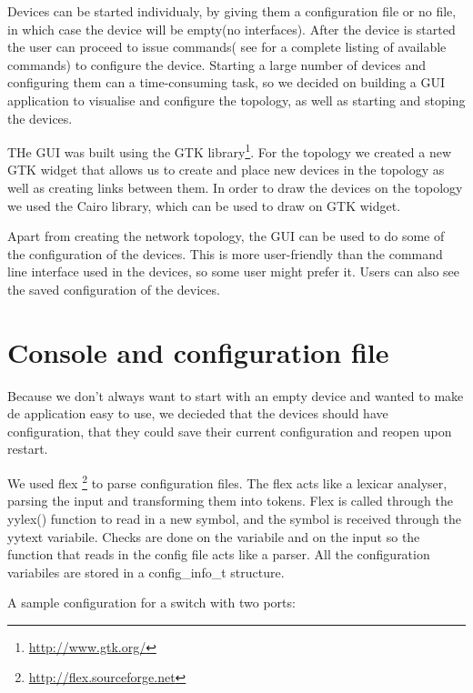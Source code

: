 Devices can be started individualy, by giving them a configuration file or no file, in which case the device
will be empty(no interfaces). After the device is started the user can proceed to issue commands( see  
for a complete listing of available commands) to configure the device. Starting a large number of
devices and configuring them can a time-consuming task, so we decided on building a GUI application to visualise and configure
the topology, as well as starting and stoping the devices.


THe GUI was built using the GTK library\footnote{\url{http://www.gtk.org/}}. For the topology we created a new GTK widget
that allows us to create and place new devices in the topology as well as creating links between them. In order to draw
the devices on the topology we used the Cairo library, which can be used to draw on GTK widget.

Apart from creating the network topology, the GUI can be used to do some of the configuration of the devices. This is 
more user-friendly than the command line interface used in the devices, so some user might prefer it. Users can also see
the saved configuration of the devices.

\section{Console and configuration file}
\label{sec:dev-conf}

Because we don't always want to start with an empty device and wanted to make de application easy to use, we decieded that the
devices should have configuration, that they could save their current configuration and reopen upon restart. 

We used flex \footnote{\url{http://flex.sourceforge.net}} to parse configuration files. The flex acts like a lexicar analyser, 
parsing the input and transforming them into tokens. Flex is called through the yylex() function to read in a new symbol, and the
symbol is received through the yytext variabile. Checks are done on the variabile and on the input so the function that reads in 
the config file acts like a parser. All the configuration variabiles are stored in a config_info_t structure.

A sample configuration for a switch with two ports:
\lstset{language=inform,caption=Example switch configuration file,label=lst:dconf}


